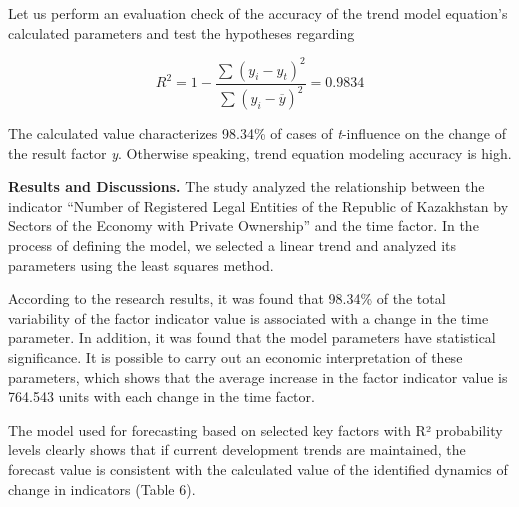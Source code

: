 \begin{multicols}{2}


Let us perform an evaluation check of the accuracy of the trend model
equation's calculated parameters and test the hypotheses regarding

\[R^{2} = 1 - \frac{\sum_{}^{}\left( y_{i} - y_{t} \right)^{2}}{\sum_{}^{}\left( y_{i} - \overline{y} \right)^{2}} = 0.9834\]

The calculated value characterizes 98.34\% of cases of
\emph{t}-influence on the change of the result factor \emph{y}.
Otherwise speaking, trend equation modeling accuracy is high.

{\bfseries Results and Discussions.} The study analyzed the relationship
between the indicator ``Number of Registered Legal Entities of the
Republic of Kazakhstan by Sectors of the Economy with Private
Ownership'' and the time factor. In the process of defining the model,
we selected a linear trend and analyzed its parameters using the least
squares method.

According to the research results, it was found that 98.34\% of the
total variability of the factor indicator value is associated with a
change in the time parameter. In addition, it was found that the model
parameters have statistical significance. It is possible to carry out an
economic interpretation of these parameters, which shows that the
average increase in the factor indicator value is 764.543 units with
each change in the time factor.

The model used for forecasting based on selected key factors with R²
probability levels clearly shows that if current development trends are
maintained, the forecast value is consistent with the calculated value
of the identified dynamics of change in indicators (Table 6).
\end{multicols}


